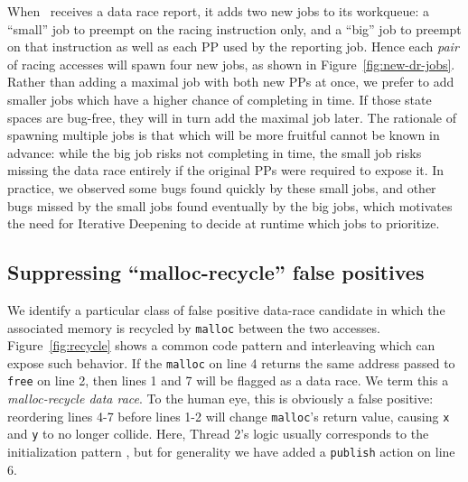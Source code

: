 When \quicksand~receives a data race report, it adds two new jobs to its workqueue:
a ``small'' job to preempt on the racing instruction only,
and a ``big'' job to preempt on that instruction as well as each PP used by the reporting job.
%
Hence each {\em pair} of racing accesses will spawn four new jobs, as shown in Figure~\ref{fig:new-dr-jobs}.
Rather than adding a maximal job with both new PPs at once, we prefer to add smaller jobs which have a higher chance of completing in time.
If those state spaces are bug-free, they will in turn add the maximal job later.
%
The rationale of spawning multiple jobs is that which will be more fruitful cannot be known in advance:
while the big job risks not completing in time,
the small job risks missing the data race entirely if the original PPs were required to expose it.
In practice, we observed some bugs found quickly by these small jobs, and other bugs missed by the small jobs found eventually by the big jobs,
which motivates the need for Iterative Deepening to decide at runtime which jobs to prioritize.

\subsection{Suppressing ``malloc-recycle'' false positives}
\label{sec:recycle}


We identify a particular class of false positive data-race candidate in which the associated memory is recycled by {\tt malloc} between the two accesses.
Figure~\ref{fig:recycle} shows a common code pattern and interleaving which can expose such behavior.
If the {\tt malloc} on line 4 returns the same address passed to {\tt free} on line 2, then lines 1 and 7 will be flagged as a data race.
We term this a {\em malloc-recycle data race}.
To the human eye, this is obviously a false positive: reordering lines 4-7 before lines 1-2 will change {\tt malloc}'s return value, causing {\tt x} and {\tt y} to no longer collide.
Here, Thread 2's logic usually corresponds to the initialization pattern \cite{eraser}, but for generality we have added a {\tt publish} action on line 6.


